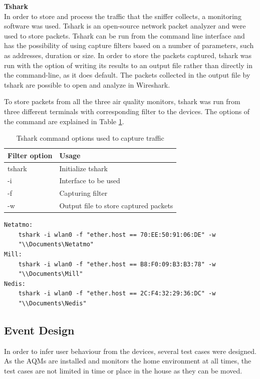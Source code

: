 \textbf{Tshark}\\
In order to store and process the traffic that the sniffer collects, a monitoring software was used. Tshark \cite{Tshark} is an open-source network packet analyzer and were used to store packets. Tshark can be run from the command line interface and has the possibility of using capture filters based on a number of parameters, such as addresses, duration or size. In order to store the packets captured, tshark was run with the option of writing its results to an output file rather than directly in the command-line, as it does default. The packets collected in the output file by tshark are possible to open and analyze in Wireshark. 

To store packets from all the three air quality monitors, tshark was run from three different terminals with corresponding filter to the devices. The options of the command are explained in Table \ref{tab:tshark}.

\begin{table}[H]
    \centering
    \caption{Tshark command options used to capture traffic}
    \begin{tabular}{|l|l|}
    \hline
    \textbf{Filter option} & \textbf{Usage}                        \\ \hline
    tshark                 & Initialize tshark                     \\ \hline
    -i                     & Interface to be used                  \\ \hline
    -f                     & Capturing filter                      \\ \hline
    -w                     & Output file to store captured packets \\ \hline
    \end{tabular}
    \label{tab:tshark}
\end{table}

\begin{verbatim}
Netatmo:
    tshark -i wlan0 -f "ether.host == 70:EE:50:91:06:DE" -w 
    "\\Documents\Netatmo"
Mill:
    tshark -i wlan0 -f "ether.host == B8:F0:09:B3:B3:78" -w 
    "\\Documents\Mill"
Nedis:
    tshark -i wlan0 -f "ether.host == 2C:F4:32:29:36:DC" -w 
    "\\Documents\Nedis"
\end{verbatim}


\subsection{Event Design}
In order to infer user behaviour from the devices, several test cases were designed. As the \gls{AQM}s are installed and monitors the home environment at all times, the test cases are not limited in time or place in the house as they can be moved. 

